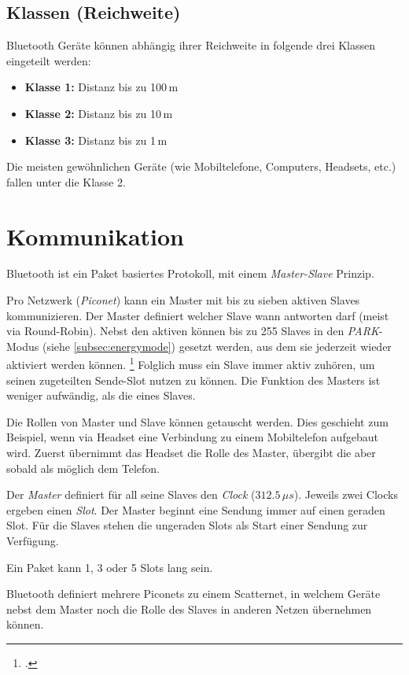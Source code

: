 \subsection{Klassen (Reichweite)}
Bluetooth Geräte können abhängig ihrer Reichweite in folgende drei Klassen eingeteilt werden:
\begin{itemize}
	\item \textbf{Klasse 1:} Distanz bis zu 100\,m
	\item \textbf{Klasse 2:} Distanz bis zu 10\,m
	\item \textbf{Klasse 3:} Distanz bis zu 1\,m
\end{itemize}
Die meisten gewöhnlichen Geräte (wie Mobiltelefone, Computers, Headsets, etc.) fallen unter die Klasse 2.



\section{Kommunikation}
Bluetooth ist ein Paket basiertes Protokoll, mit einem \textit{Master-Slave} Prinzip.

Pro Netzwerk (\textit{Piconet}) kann ein Master mit bis zu sieben aktiven Slaves kommunizieren.
Der Master definiert welcher Slave wann antworten darf (meist via Round-Robin). 
Nebst den aktiven können bis zu 255 Slaves in den \textit{PARK}-Modus (siehe \cref{subsec:energymode}) gesetzt werden, aus dem sie jederzeit wieder aktiviert werden können.
\footcite{Piconet_-_Wikipedia_2015-04-18}
Folglich muss ein Slave immer aktiv zuhören, um seinen zugeteilten Sende-Slot nutzen zu können. Die Funktion des Masters ist weniger aufwändig, als die eines Slaves.

Die Rollen von Master und Slave können getauscht werden.
Dies geschieht zum Beispiel, wenn via Headset eine Verbindung zu einem Mobiltelefon aufgebaut wird.
Zuerst übernimmt das Headset die Rolle des Master, übergibt die aber sobald als möglich dem Telefon.

Der \textit{Master} definiert für all seine Slaves den \textit{Clock} ($312.5\,\mu s$).
Jeweils zwei Clocks ergeben einen \textit{Slot}.
Der Master beginnt eine Sendung immer auf einen geraden Slot.
Für die Slaves stehen die ungeraden Slots als Start einer Sendung zur Verfügung.

Ein Paket kann 1, 3 oder 5 Slots lang sein.

Bluetooth definiert mehrere Piconets zu einem Scatternet, in welchem Geräte nebst dem Master noch die Rolle des Slaves in anderen Netzen übernehmen können.

